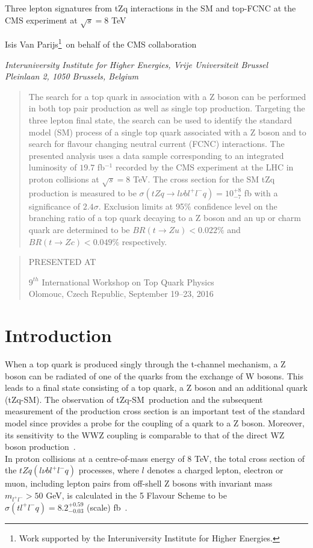 \documentclass[12pt]{article}
\newcommand\pubnumber{SNSN-323-63}
\newcommand\pubdate{\today}
\def\institute{Interuniversity Institute for Higher Energies, Vrije Universiteit Brussel\\
Pleinlaan 2, 1050 Brussels, Belgium}
\def\support{\footnote{Work supported by the Interuniversity Institute for Higher Energies.}}
\def\Title#1{\begin{center} {\Large #1 } \end{center}}
\def\Author#1{\begin{center}{ \sc #1} \end{center}}
\def\Address#1{\begin{center}{ \it #1} \end{center}}
\newcommand\pubblock{\rightline{\begin{tabular}{l} \pubnumber\\
         \pubdate  \end{tabular}}}
\newenvironment{Abstract}{\begin{quotation}  }{\end{quotation}}
\newenvironment{Presented}{\begin{quotation} \begin{center} 
             PRESENTED AT\end{center}\bigskip 
      \begin{center}\begin{large}}{\end{large}\end{center} \end{quotation}}
\def\SM{tZq-SM}
\begin{document}
\begin{titlepage}
\pubblock

\vfill
\Title{Three lepton signatures from tZq interactions in the SM and top-FCNC at the CMS experiment at $\sqrt{s}=8$ TeV}
\vfill
\Author{ Isis Van Parijs\support\ on behalf of the CMS collaboration}
\Address{\institute}
\vfill
\begin{Abstract}
The search for a top quark in association with a Z boson can be performed in both top pair production as well as single top production. Targeting the three lepton final state, the search can be used to identify the standard model (SM) process of a single top quark associated with a Z boson and to search for flavour changing neutral current (FCNC) interactions. The presented analysis uses a data sample corresponding to an integrated luminosity of $19.7$ fb$^{-1}$ recorded by the CMS experiment at the LHC in proton collisions at $\sqrt{s}=8$ TeV. The cross section for the SM tZq production is measured to be $\sigma(tZq\rightarrow l\nu bl^+ l^- q)= 10^{+8}_{-7}$ fb with a significance of $2.4 \sigma$. Exclusion limits at 95$\%$ confidence level  on the branching ratio of a top quark decaying to a Z boson and an up or charm quark are determined to be $BR(t \rightarrow Zu) < 0.022\%$ and $BR(t \rightarrow Zc) < 0.049\%$ respectively. 
\end{Abstract}
\vfill
\begin{Presented}
$9^{th}$ International Workshop on Top Quark Physics\\
Olomouc, Czech Republic,  September 19--23, 2016
\end{Presented}
\vfill
\end{titlepage}
\def\thefootnote{\fnsymbol{footnote}}
\setcounter{footnote}{0}
%

\section{Introduction}
When a top quark is produced singly through the t-channel mechanism,  a Z boson can be radiated of one of the quarks from the exchange of W bosons. This leads to a final state consisting of a top quark, a Z boson and an additional quark (\SM). 
The observation of \SM\ production and the subsequent measurement of the production cross section is an important test of the standard model since provides a probe for the coupling of a quark to a Z boson. Moreover, its sensitivity  to the WWZ coupling is comparable to that of the direct WZ boson production~\cite{10}.\\
 In proton collisions at a centre-of-mass energy of $8$ TeV, the total cross section of the $tZq(l\nu bl^+l^-q)$ processes, where $l$ denotes a charged lepton, electron or muon, including
lepton pairs from off-shell Z bosons with invariant mass $m_{l^+l^-} > 50$ GeV, is calculated in the 5 Flavour Scheme to be $\sigma(tl^+ l^- q) = 8.2^{+0.59}_{-0.03}$ (scale) fb~\cite{13}. \\
\end{document}
